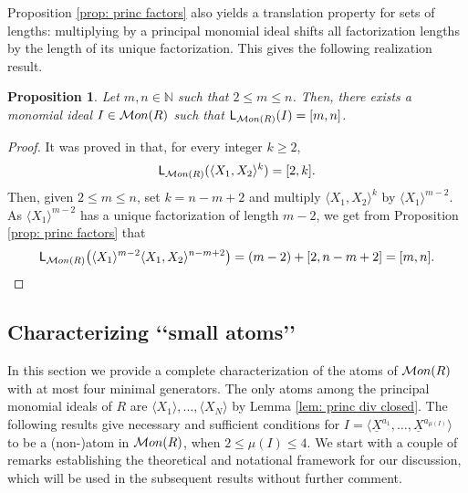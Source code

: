 \documentclass[10pt,a4paper]{amsart}
\newtheorem{proposition}[theorem]{Proposition}
\providecommand\Mon{{\mathcal{M}{\rm on}}}
\begin{document}
Proposition \ref{prop: princ factors} also yields a translation property for sets of lengths: multiplying by a principal monomial ideal shifts all factorization lengths by the length of its unique factorization. This gives the following realization result.

\begin{proposition}\label{prop: relization of SOL}
  Let $m,n\in \mathbb N$ such that $2\le m\le n$. Then, there exists a monomial ideal $I\in \Mon(R)$ such that $\mathsf L_{\Mon(R)}(I)=[m,n]$.
\end{proposition}
\begin{proof}
It was proved in \cite[Theorem 4.7(3)]{BCK} that, for every integer $k\ge 2$,
\[ \mathsf L_{\Mon(R)}(\langle X_1,X_2\rangle^k)=[2,k].\]
Then, given \(2\le m\le n\), set $k=n-m+2$ and multiply $\langle X_1,X_2\rangle^k$ by $\langle X_1\rangle^{m-2}$. As $\langle X_1\rangle^{m-2}$ has a unique factorization of length $m-2$, we get from Proposition \ref{prop: princ factors} that
\[ \mathsf L_{\Mon(R)} \bigl(\langle X_1\rangle^{m-2}\langle X_1,X_2\rangle^{n-m+2}\bigr) = (m-2)+[2,n-m+2] = [m,n].\]
\end{proof}

\subsection{Characterizing \lq\lq small atoms\rq\rq}\label{char atom mu le 4}
In this section we provide a complete characterization of the atoms of $\Mon(R)$ with at most four minimal generators. The only atoms among the principal monomial ideals of $R$ are $\langle X_1\rangle, \dots, \langle X_N\rangle$ by Lemma \ref{lem: princ div closed}. The following results give necessary and sufficient conditions for $I=\langle\underline X^{a_1},\dots,\underline X^{a_{\mu(I)}}\rangle$ to be a (non-)atom in $\Mon(R)$, when $2\le \mu(I)\le 4$. We start with a couple of remarks establishing the theoretical and notational framework for our discussion, which will be used in the subsequent results without further comment.
\end{document}
